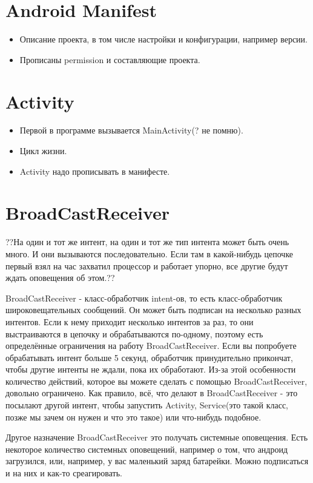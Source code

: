\documentclass[12 pt]{article}
\begin{document}
\section{Android Manifest}
    \begin{itemize}
    	\item Описание проекта, в том числе настройки и конфигурации, например версии.
    	\item Прописаны permission и составляющие проекта.
    \end{itemize}

\section{Activity}
    \begin{itemize}
    	\item Первой в программе вызывается MainActivity(? не помню).
    	\item Цикл жизни.
   		\item Activity надо прописывать в манифесте.
   	\end{itemize}

\section{BroadCastReceiver}
    ??На один и тот же интент, на один и тот же тип интента может быть очень много. И они вызываются последовательно. Если там в какой-нибудь цепочке первый взял на час захватил процессор и работает упорно, все другие будут ждать оповещения об этом.?? 
    
    BroadCastReceiver - класс-обработчик intent-ов, то есть класс-обработчик широковещательных сообщений. Он может быть подписан на несколько разных интентов. Если к нему приходит несколько интентов за раз, то они выстраиваются в цепочку и обрабатываются по-одному, поэтому есть определённые ограничения на работу BroadCastReceiver. Если вы попробуете обрабатывать интент больше 5 секунд, обработчик принудительно прикончат, чтобы другие интенты не ждали, пока их обработают. Из-за этой особенности количество действий, которое вы можете сделать с помощью BroadCastReceiver, довольно ограничено. Как правило, всё, что делают в BroadCastReceiver - это посылают другой интент, чтобы запустить Activity, Service(это такой класс, позже мы зачем он нужен и что это такое) или что-нибудь подобное. 
    
    Другое назначение BroadCastReceiver это получать системные оповещения. Есть некоторое количество системных оповещений, например о том, что андроид загрузился, или, например, у вас маленький заряд батарейки. Можно подписаться и на них и как-то среагировать. 
    
\end{document}
